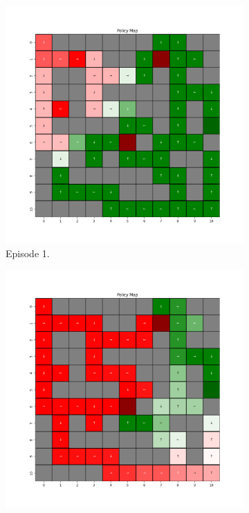 \documentclass{assignment}
\begin{document}
\begin{figure}[H]
    \begin{subfigure}{0.3\textwidth}
        \includegraphics[width=\textwidth]{figures/policy_q/gamma_sweep/policy_alpha_0.1_gamma_0.25_epsilon_0.2_iteration_1.png}
    \caption{Episode 1.}
    \end{subfigure}\hfill
    \begin{subfigure}{0.3\textwidth}
        \includegraphics[width=\textwidth]{figures/policy_q/gamma_sweep/policy_alpha_0.1_gamma_0.25_epsilon_0.2_iteration_50.png}

\end{subfigure}
\end{figure}
\end{document}
